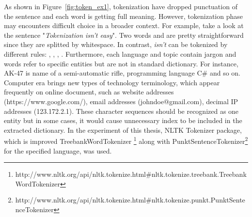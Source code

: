 As shown in Figure~\ref{fig:token_ex1}, tokenization have dropped punctuation of the sentence and each word is getting full meaning. However, tokenization phase may encounters difficult choice in a broader context. For example, take a look at the sentence "\textit{Tokenization isn't easy}". Two words  and  are pretty straightforward since they are splitted by whitespace. In contrast, \textit{isn't} can be tokenized by different rules: , ,  ,  . Furthermore, each language and topic contain jargon and words refer to specific entities but are not in standard dictionary. For instance, AK-47 is name of a semi-automatic rifle, programming language C\# and so on. Computer era brings new types of technology terminology, which appear frequently on online document, such as website addresses (https://www.google.com/), email addresses (johndoe@gmail.com), decimal IP addresses (123.172.2.1). These character sequences should be recognized as one entity but in some cases, it would cause unnecessary index to be included in the extracted dictionary. In the experiment of this thesis, NLTK Tokenizer package, which is improved TreebankWordTokenizer \footnote{http://www.nltk.org/api/nltk.tokenize.html\#nltk.tokenize.treebank.TreebankWordTokenizer} along with PunktSentenceTokenizer\footnote{http://www.nltk.org/api/nltk.tokenize.html\#nltk.tokenize.punkt.PunktSentenceTokenizer} for the specified language, was used.\\

